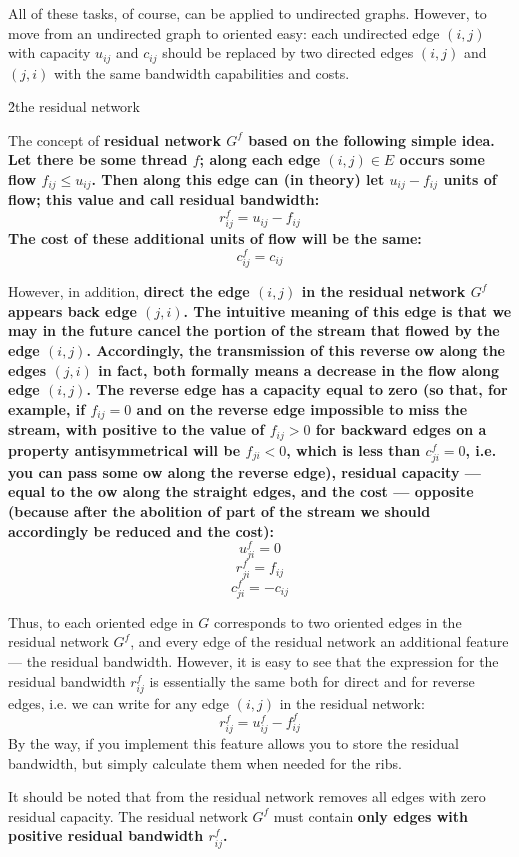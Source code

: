 All of these tasks, of course, can be applied to undirected graphs. However, to move from an undirected graph to oriented easy: each undirected edge $(i,j)$ with capacity $u_{ij}$ and $c_{ij}$ should be replaced by two directed edges $(i,j)$ and $(j,i)$ with the same bandwidth capabilities and costs.

\h2{the residual network}

The concept of \bf{residual network} $G^f$ based on the following simple idea. Let there be some thread $f$; along each edge $(i,j) \in E$ occurs some flow $f_{ij} \le u_{ij}$. Then along this edge can (in theory) let $u_{ij} - f_{ij}$ units of flow; this value and call \bf{residual bandwidth}:
$$ r_{ij}^f = u_{ij} - f_{ij} $$
The cost of these additional units of flow will be the same:
$$ c_{ij}^f = c_{ij} $$

However, in addition, \bf{direct} the edge $(i,j)$ in the residual network $G^f$ appears \bf{back edge} $(j,i)$. The intuitive meaning of this edge is that we may in the future cancel the portion of the stream that flowed by the edge $(i,j)$. Accordingly, the transmission of this reverse ow along the edges $(j,i)$ in fact, both formally means a decrease in the flow along edge $(i,j)$. The reverse edge has a capacity equal to zero (so that, for example, if $f_{ij}=0$ and on the reverse edge impossible to miss the stream, with positive to the value of $f_{ij}>0$ for backward edges on a property antisymmetrical will be $f_{ji}<0$, which is less than $c_{ji}^f = 0$, i.e. you can pass some ow along the reverse edge), residual capacity --- equal to the ow along the straight edges, and the cost --- opposite (because after the abolition of part of the stream we should accordingly be reduced and the cost):
$$ u_{ji}^f = 0 $$
$$ r_{ji}^f = f_{ij} $$
$$ c_{ji}^f = -c_{ij} $$

Thus, to each oriented edge in $G$ corresponds to two oriented edges in the residual network $G^f$, and every edge of the residual network an additional feature --- the residual bandwidth. However, it is easy to see that the expression for the residual bandwidth $r_{ij}^f$ is essentially the same both for direct and for reverse edges, i.e. we can write for any edge $(i,j)$ in the residual network:
$$ r_{ij}^f = u_{ij}^f - f_{ij}^f $$
By the way, if you implement this feature allows you to store the residual bandwidth, but simply calculate them when needed for the ribs.

It should be noted that from the residual network removes all edges with zero residual capacity. The residual network $G^f$ must contain \bf{only edges with positive residual bandwidth $r_{ij}^f$}.

